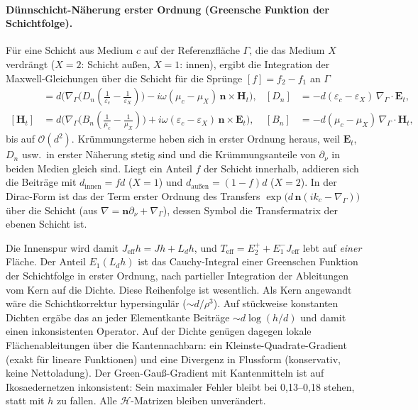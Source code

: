\documentclass[11pt, a4paper]{article}
\newcommand{\mvec}[1]{\boldsymbol{#1}}
\newcommand{\n}{\mvec{n}}
\theoremstyle{plain}
\theoremstyle{definition}
\begin{document}
\paragraph{Dünnschicht-Näherung erster Ordnung (Greensche Funktion der Schichtfolge).}
Für eine Schicht aus Medium $c$ auf der Referenzfläche $\Gamma$, die das Medium $X$ verdrängt ($X=2$: Schicht
außen, $X=1$: innen), ergibt die Integration der Maxwell-Gleichungen über die Schicht für die Sprünge
$[f]=f_2-f_1$ an $\Gamma$
\begin{align*}
  [\mvec{E}_t]&=d\big(\nabla_\Gamma\big(D_n(\tfrac1{\varepsilon_c}-\tfrac1{\varepsilon_X})\big)
     -i\omega(\mu_c-\mu_X)\,\n\times\mvec{H}_t\big), &
  [D_n]&=-d(\varepsilon_c-\varepsilon_X)\,\nabla_\Gamma\!\cdot\mvec{E}_t,\\
  [\mvec{H}_t]&=d\big(\nabla_\Gamma\big(B_n(\tfrac1{\mu_c}-\tfrac1{\mu_X})\big)
     +i\omega(\varepsilon_c-\varepsilon_X)\,\n\times\mvec{E}_t\big), &
  [B_n]&=-d(\mu_c-\mu_X)\,\nabla_\Gamma\!\cdot\mvec{H}_t,
\end{align*}
bis auf $\mathcal{O}(d^2)$. Krümmungsterme heben sich in erster Ordnung heraus, weil $\mvec{E}_t$, $D_n$ usw.\ in erster
Näherung stetig sind und die Krümmungsanteile von $\partial_\nu$ in beiden Medien gleich sind. Liegt ein Anteil $f$ der
Schicht innerhalb, addieren sich die Beiträge mit $d_{\mathrm{innen}}=fd$ ($X=1$) und $d_{\mathrm{außen}}=(1-f)d$
($X=2$). In der Dirac-Form ist das der Term erster Ordnung des Transfers $\exp\big(d\,\n(ik_c-\nabla_\Gamma)\big)$
über die Schicht (aus $\nabla=\n\partial_\nu+\nabla_\Gamma$), dessen Symbol die Transfermatrix der ebenen Schicht ist.

Die Innenspur wird damit $J_{\mathrm{eff}}h=Jh+L_dh$, und $T_{\mathrm{eff}}=E_2^++E_1^-J_{\mathrm{eff}}$ lebt auf
\emph{einer} Fläche. Der Anteil $E_1(L_dh)$ ist das Cauchy-Integral einer Greenschen Funktion der Schichtfolge in
erster Ordnung, nach partieller Integration der Ableitungen vom Kern auf die Dichte. Diese Reihenfolge ist
wesentlich. Als Kern angewandt wäre die Schichtkorrektur hypersingulär ($\sim d/\rho^3$). Auf stückweise konstanten
Dichten ergäbe das an jeder Elementkante Beiträge $\sim d\log(h/d)$ und damit einen inkonsistenten Operator.
Auf der Dichte genügen dagegen lokale Flächenableitungen über die Kantennachbarn: ein Kleinste-Quadrate-Gradient
(exakt für lineare Funktionen) und eine Divergenz in Flussform (konservativ, keine Nettoladung). Der
Green-Gauß-Gradient mit Kantenmitteln ist auf Ikosaedernetzen inkonsistent: Sein maximaler Fehler bleibt bei
0,13--0,18 stehen, statt mit $h$ zu fallen. Alle $\mathcal{H}$-Matrizen bleiben unverändert.
\end{document}

